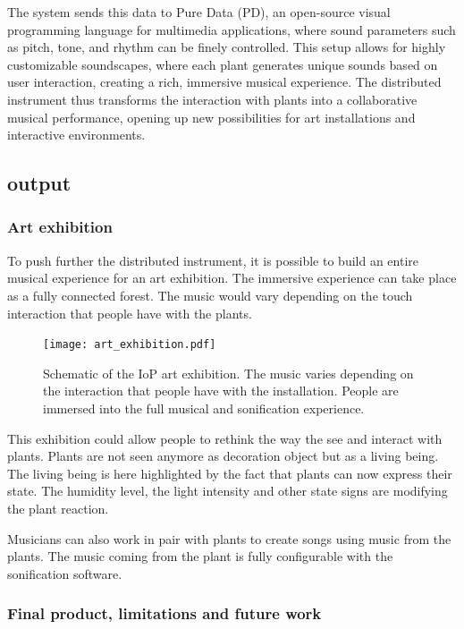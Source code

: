 The system sends this data to Pure Data (PD), an open-source visual programming language for multimedia applications, where sound parameters such as pitch, tone, and rhythm can be finely controlled. This setup allows for highly customizable soundscapes, where each plant generates unique sounds based on user interaction, creating a rich, immersive musical experience. The distributed instrument thus transforms the interaction with plants into a collaborative musical performance, opening up new possibilities for art installations and interactive environments.

\subsection{output}

\subsubsection{Art exhibition}

To push further the distributed instrument, it is possible to build an entire 
musical experience for an art exhibition.
The immersive experience can take place as a fully connected forest. The music would vary
depending on the touch interaction that people have with the plants.

\begin{figure}[h!]
    \centering
    \texttt{[image: art\_exhibition.pdf]}
    \caption{Schematic of the IoP art exhibition. The music varies depending on the 
    interaction that people have with the installation. People are immersed into the full
    musical and sonification experience.} 
    \vspace{0.1cm}
    \label{fig:art_exhibition}
\end{figure}

This exhibition could allow people to rethink the way the see and interact with plants.
Plants are not seen anymore as decoration object but as a living being.
The living being is here highlighted by the fact that plants can now express their state.
The humidity level, the light intensity and other state signs are modifying the plant 
reaction.


Musicians can also work in pair with plants to create songs using music from the plants.
The music coming from the plant is fully configurable with the sonification software.


\subsubsection{Final product, limitations and future work}

